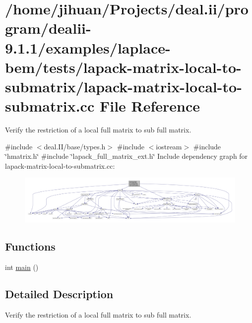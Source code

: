 \hypertarget{lapack-matrix-local-to-submatrix_8cc}{}\section{/home/jihuan/\+Projects/deal.ii/program/dealii-\/9.1.1/examples/laplace-\/bem/tests/lapack-\/matrix-\/local-\/to-\/submatrix/lapack-\/matrix-\/local-\/to-\/submatrix.cc File Reference}
\label{lapack-matrix-local-to-submatrix_8cc}


Verify the restriction of a local full matrix to sub full matrix.  


{\ttfamily \#include $<$deal.\+I\+I/base/types.\+h$>$}\newline
{\ttfamily \#include $<$iostream$>$}\newline
{\ttfamily \#include \char`\"{}hmatrix.\+h\char`\"{}}\newline
{\ttfamily \#include \char`\"{}lapack\+\_\+full\+\_\+matrix\+\_\+ext.\+h\char`\"{}}\newline
Include dependency graph for lapack-\/matrix-\/local-\/to-\/submatrix.cc\+:
\nopagebreak
\begin{figure}[H]
\begin{center}
\leavevmode
\includegraphics[width=350pt]{lapack-matrix-local-to-submatrix_8cc__incl}
\end{center}
\end{figure}
\subsection*{Functions}
\begin{DoxyCompactItemize}
\item 
int \hyperlink{lapack-matrix-local-to-submatrix_8cc_ae66f6b31b5ad750f1fe042a706a4e3d4}{main} ()
\end{DoxyCompactItemize}


\subsection{Detailed Description}
Verify the restriction of a local full matrix to sub full matrix. 

